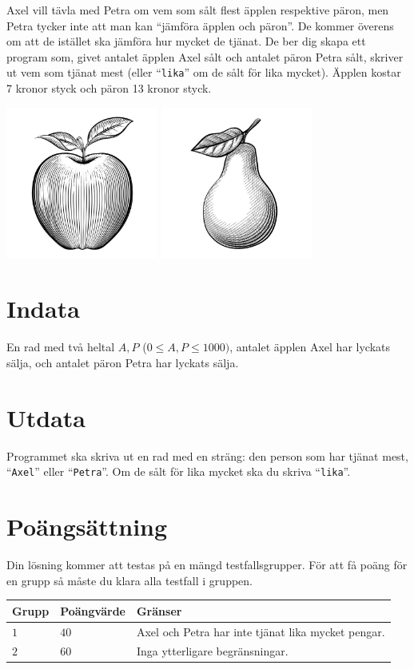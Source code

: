 Axel vill tävla med Petra om vem som sålt flest äpplen respektive päron, men Petra tycker inte att man kan ``jämföra äpplen och päron''. De kommer överens om att de istället ska jämföra hur mycket de tjänat. De ber dig skapa ett program som, givet antalet äpplen Axel sålt och antalet päron Petra sålt, skriver ut vem som tjänat mest (eller ``\texttt{lika}'' om de sålt för lika mycket). Äpplen kostar 7 kronor styck och päron 13 kronor styck.

\begin{center}
  \includegraphics[width=5cm]{apple.jpg}
  \includegraphics[width=5cm]{pear.jpg}
\end{center}

\section*{Indata}
En rad med två heltal $A,P$ ($0 \le A,P \le 1000)$, antalet äpplen Axel har lyckats sälja, och antalet päron Petra har lyckats sälja. 

\section*{Utdata}
Programmet ska skriva ut en rad med en sträng: den person som har tjänat mest, ``\texttt{Axel}'' eller ``\texttt{Petra}''. Om de sålt för lika mycket ska du skriva ``\texttt{lika}''.

\section*{Poängsättning}
Din lösning kommer att testas på en mängd testfallsgrupper.
För att få poäng för en grupp så måste du klara alla testfall i gruppen.

\noindent
\begin{tabular}{| l | l | l |}
  \hline
  Grupp & Poängvärde & Gränser \\ \hline
  $1$   & $40$       & Axel och Petra har inte tjänat lika mycket pengar. \\ \hline
  $2$   & $60$       & Inga ytterligare begränsningar. \\ \hline
\end{tabular}